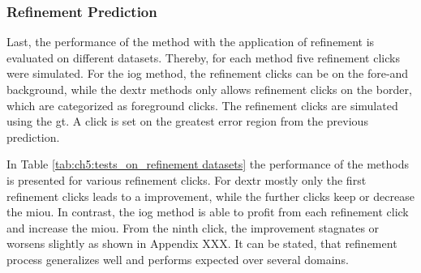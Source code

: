 \subsubsection{Refinement Prediction}

Last, the performance of the method with the application of refinement is evaluated on different datasets.
Thereby, for each method five refinement clicks were simulated.
For the \gls{iog} method, the refinement clicks can be on the fore-and background, while the \gls{dextr} methods only allows refinement clicks on the border, which are categorized as foreground clicks.
The refinement clicks are simulated using the \gls{gt}.
A click is set on the greatest error region from the previous prediction.

In Table \ref{tab:ch5:tests_on_refinement datasets} the performance of the methods is presented for various refinement clicks.
For \gls{dextr} mostly only the first refinement clicks leads to a improvement, while the further clicks keep or decrease the \gls{miou}.
In contrast, the \gls{iog} method is able to profit from each refinement click and increase the \gls{miou}. 
From the ninth click, the improvement stagnates or worsens slightly as shown in Appendix XXX. 
It can be stated, that refinement process generalizes well and performs expected over several domains.

